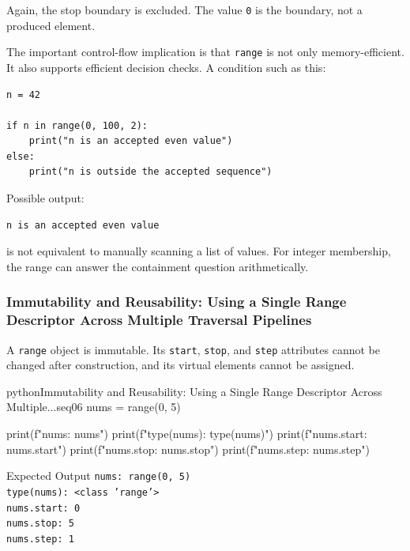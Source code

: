 \documentclass[a4paper,twoside]{report}
\begin{document}
Again, the stop boundary is excluded. The value \texttt{0} is the boundary, not a produced element.

The important control-flow implication is that \texttt{range} is not only memory-efficient. It also supports efficient decision checks. A condition such as this:

\begin{verbatim}
n = 42

if n in range(0, 100, 2):
    print("n is an accepted even value")
else:
    print("n is outside the accepted sequence")
\end{verbatim}

Possible output:

\begin{verbatim}
n is an accepted even value
\end{verbatim}

is not equivalent to manually scanning a list of values. For integer membership, the range can answer the containment question arithmetically.

\subsubsection{Immutability and Reusability: Using a Single Range Descriptor Across Multiple Traversal Pipelines}

A \texttt{range} object is immutable. Its \texttt{start}, \texttt{stop}, and \texttt{step} attributes cannot be changed after construction, and its virtual elements cannot be assigned.

\begin{codebox}[]{python}{Immutability and Reusability: Using a Single Range Descriptor Across Multiple...}{seq06}
nums = range(0, 5)

print(f"nums: {nums}")
print(f"type(nums): {type(nums)}")
print(f"nums.start: {nums.start}")
print(f"nums.stop: {nums.stop}")
print(f"nums.step: {nums.step}")
\end{codebox}


\begin{iobox}{Expected Output}
\texttt{nums: range(0, 5)} \\
\texttt{type(nums): <class 'range'>} \\
\texttt{nums.start: 0} \\
\texttt{nums.stop: 5} \\
\texttt{nums.step: 1} \\
\end{iobox}
\end{document}

